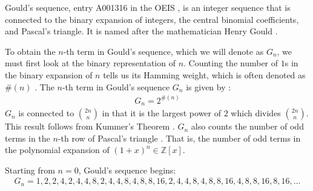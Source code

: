 \documentclass{article}
\theoremstyle{plain}
\theoremstyle{definition}
\newcommand{\Z}{\mathbb{Z}}
\newcommand{\wt}[1]{\#(#1)}
\begin{document}
Gould's sequence, entry A001316 in the OEIS \cite{A001316}, is an integer sequence that is connected to the binary expansion of integers, the central binomial coefficients, and Pascal's triangle. It is named after the mathematician Henry Gould \cite{A001316}.

To obtain the $n$-th term in Gould's sequence, which we will denote as $G_n$, we must first look at the binary representation of $n$. Counting the number of $1$s in the binary expansion of $n$ tells us its Hamming weight, which is often denoted as $\wt{n}$ \cite{Lin2004}. The $n$-th term in Gould's sequence $G_n$ is given by \cite{A001316}:
\begin{align}
    G_n = 2^{\wt{n}}
\end{align}
$G_n$ is connected to $\binom{2n}{n}$ in that it is the largest power of $2$ which divides $\binom{2n}{n}$. This result follows from Kummer's Theorem \cite{Kummer1857}. $G_n$ also counts the number of odd terms in the $n$-th row of Pascal's triangle \cite{Glaisher1899}. That is, the number of odd terms in the polynomial expansion of $(1+x)^n \in \Z[x]$.

Starting from $n=0$, Gould's sequence begins:
\begin{align*}
    G_n = 1, 2, 2, 4, 2, 4, 4, 8, 2, 4, 4, 8, 4, 8, 8, 16, 2, 4, 4, 8, 4, 8, 8, 16, 4, 8, 8, 16, 8, 16, \ldots
\end{align*}
\end{document}
